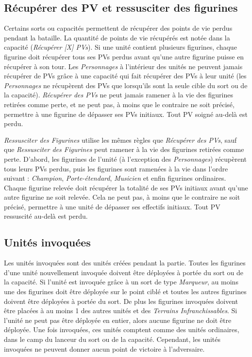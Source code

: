 \subsection{Récupérer des PV et ressusciter des figurines}

Certains sorts ou capacités permettent de récupérer des points de vie perdus pendant la bataille. La quantité de points de vie récupérés est notée dans la capacité (\emph{Récupérer [X] PVs}). Si une unité contient plusieurs figurines, chaque figurine doit récupérer tous ses PVs perdus avant qu'une autre figurine puisse en récupérer à son tour. Les \emph{Personnages} à l'intérieur des unités ne peuvent jamais récupérer de PVs grâce à une capacité qui fait récupérer des PVs à leur unité (les \emph{Personnages} ne récupèrent des PVs que lorsqu'ils sont la seule cible du sort ou de la capacité). \emph{Récupérer des PVs} ne peut jamais ramener à la vie des figurines retirées comme perte, et ne peut pas, à moins que le contraire ne soit précisé, permettre à une figurine de dépasser ses PVs initiaux. Tout PV soigné au-delà est perdu.

\emph{Ressusciter des Figurines} utilise les mêmes règles que \emph{Récupérer des PVs}, sauf que \emph{Ressusciter des Figurines} peut ramener à la vie des figurines retirées comme perte. D'abord, les figurines de l'unité (à l'exception des \emph{Personnages}) récupèrent tous leurs PVs perdus, puis les figurines sont ramenées à la vie dans l'ordre suivant : \emph{Champion}, \emph{Porte-étendard}, \emph{Musicien} et enfin figurines ordinaires. Chaque figurine relevée doit récupérer la totalité de ses PVs initiaux avant qu'une autre figurine ne soit relevée. Cela ne peut pas, à moins que le contraire ne soit précisé, permettre à une unité de dépasser ses effectifs initiaux. Tout PV ressuscité au-delà est perdu.

\subsection{Unités invoquées}

Les unités invoquées sont des unités créées pendant la partie. Toutes les figurines d'une unité nouvellement invoquée doivent être déployées à portée du sort ou de la capacité. Si l'unité est invoquée grâce à un sort de type \emph{Marqueur}, au moins une des figurines doit être déployée sur le point ciblé et toutes les autres figurines doivent être déployées à portée du sort. De plus les figurines invoquées doivent être placées à au moins \unit{1}{\pouce} des autres unités et des \emph{Terrains Infranchissables}. 
Si l'unité ne peut pas être déployée en entier, alors aucune figurine ne doit être déployée. Une fois invoquées, ces unités comptent comme des unités ordinaires, dans le camp du lanceur du sort ou de la capacité. Cependant, les unités invoquées ne peuvent donner aucun point de victoire à l'adversaire.
